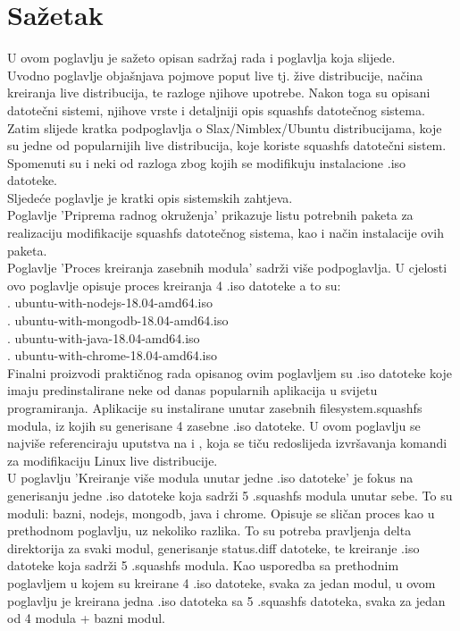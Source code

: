 \documentclass[12pt,vi]{mitthesis}
\begin{document}
\chapter*{Sažetak}
\indent
U ovom poglavlju je sažeto opisan sadržaj rada i poglavlja koja slijede.\\
\indent
Uvodno poglavlje objašnjava pojmove poput live tj. žive distribucije, načina kreiranja live distribucija, te razloge njihove upotrebe.
Nakon toga su opisani datotečni sistemi, njihove vrste i detaljniji opis squashfs datotečnog sistema.
Zatim slijede kratka podpoglavlja o Slax/Nimblex/Ubuntu distribucijama, koje su jedne od popularnijih live distribucija, koje koriste squashfs datotečni sistem. Spomenuti su i neki od razloga zbog kojih se modifikuju instalacione .iso datoteke.\\
\indent
Sljedeće poglavlje je kratki opis sistemskih zahtjeva.\\
\indent
Poglavlje 'Priprema radnog okruženja' prikazuje listu potrebnih paketa za realizaciju modifikacije squashfs datotečnog sistema, kao i način instalacije ovih paketa.\\
\indent
Poglavlje 'Proces kreiranja zasebnih modula' sadrži više podpoglavlja. U cjelosti ovo poglavlje opisuje proces kreiranja 4 .iso datoteke a to su:\\
. ubuntu-with-nodejs-18.04-amd64.iso\\
. ubuntu-with-mongodb-18.04-amd64.iso\\
. ubuntu-with-java-18.04-amd64.iso\\
. ubuntu-with-chrome-18.04-amd64.iso\\
Finalni proizvodi praktičnog rada opisanog ovim poglavljem su .iso datoteke koje imaju predinstalirane neke od danas popularnih aplikacija u svijetu programiranja. Aplikacije su instalirane unutar zasebnih filesystem.squashfs modula, iz kojih su generisane 4 zasebne .iso datoteke. U ovom poglavlju se najviše referenciraju uputstva na \cite{ubuntuLiveCD} i \cite{custom-ubuntu-live}, koja se tiču redoslijeda izvršavanja komandi za modifikaciju Linux live distribucije.\\
\indent
U poglavlju 'Kreiranje više modula unutar jedne .iso datoteke' je fokus na generisanju jedne .iso datoteke koja sadrži 5 .squashfs modula unutar sebe. To su moduli: bazni, nodejs, mongodb, java i chrome. Opisuje se sličan proces kao u prethodnom poglavlju, uz nekoliko razlika. To su potreba pravljenja delta direktorija za svaki modul, generisanje status.diff datoteke, te kreiranje .iso datoteke koja sadrži 5 .squashfs modula. Kao usporedba sa prethodnim poglavljem u kojem su kreirane 4 .iso datoteke, svaka za jedan modul, u ovom poglavlju je kreirana jedna .iso datoteka sa 5 .squashfs datoteka, svaka za jedan od 4 modula + bazni modul.\\
\end{document}
